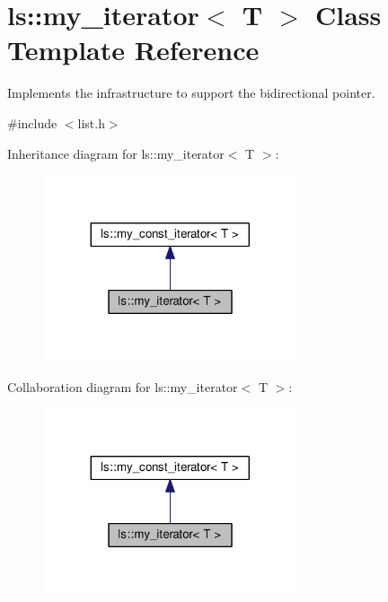 \hypertarget{classls_1_1my__iterator}{}\section{ls\+:\+:my\+\_\+iterator$<$ T $>$ Class Template Reference}
\label{classls_1_1my__iterator}


Implements the infrastructure to support the bidirectional pointer.  




{\ttfamily \#include $<$list.\+h$>$}



Inheritance diagram for ls\+:\+:my\+\_\+iterator$<$ T $>$\+:\nopagebreak
\begin{figure}[H]
\begin{center}
\leavevmode
\includegraphics[width=212pt]{classls_1_1my__iterator__inherit__graph}
\end{center}
\end{figure}


Collaboration diagram for ls\+:\+:my\+\_\+iterator$<$ T $>$\+:\nopagebreak
\begin{figure}[H]
\begin{center}
\leavevmode
\includegraphics[width=212pt]{classls_1_1my__iterator__coll__graph}
\end{center}
\end{figure}
